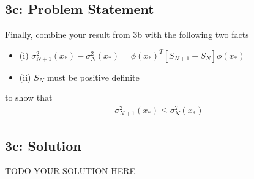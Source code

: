 \documentclass[10pt]{article}
\newcommand{\officialdirections}[1]{{\color{purple} #1}}
\begin{document}
\officialdirections{
\subsection*{3c: Problem Statement}

Finally, combine your result from 3b with the following two facts

\begin{itemize}
    \item (i) $\sigma^2_{N+1}(x_*) - \sigma^2_{N}(x_*) = \phi(x_*)^T \left[ S_{N+1} - S_{N} \right] \phi(x_*)$
    \item (ii) $S_N$ must be positive definite
\end{itemize}

to show that
\begin{align}
\sigma_{N+1}^2(x_*) \leq \sigma_N^2(x_*)
\end{align}
}


\subsection{3c: Solution}
TODO YOUR SOLUTION HERE
\end{document}
